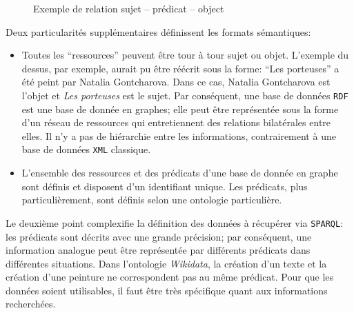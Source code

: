 \documentclass[a4paper, 12pt, twoside]{book}
\newcommand{\rdf}{\texttt{RDF}}
\newcommand{\sparql}{\texttt{\gls{SPARQL}}}
\newcommand{\xml}{\texttt{XML}}
\newcommand{\wkd}{\textit{Wikidata}}
\begin{document}
\begin{figure}[!h]
	\centering
	\caption{Exemple de relation sujet -- prédicat -- object}
	\label{fig:triplet}
\end{figure}

Deux particularités supplémentaires définissent les formats sémantiques:
\begin{itemize}
	\item Toutes les \enquote{ressources} peuvent être tour à tour sujet ou objet. L'exemple du dessus, par exemple, aurait pu être réécrit sous la forme: \enquote{Les porteuses} a été peint par Natalia Gontcharova. Dans ce cas, Natalia Gontcharova est l'objet et \textit{Les porteuses} est le sujet. Par conséquent, une base de données \rdf{} est une base de donnée en graphes; elle peut être représentée sous la forme d'un réseau de ressources qui entretiennent des relations bilatérales entre elles. Il n'y a pas de hiérarchie entre les informations, contrairement à une base de données \xml{} classique.
	\item L'ensemble des ressources et des prédicats d'une base de donnée en graphe sont définis et disposent d'un identifiant unique. Les prédicats, plus particulièrement, sont définis selon une ontologie particulière.
\end{itemize}

Le deuxième point complexifie la définition des données à récupérer via \sparql{}: les prédicats sont décrits avec une grande précision; par conséquent, une information analogue peut être représentée par différents prédicats dans différentes situations. Dans l'ontologie \wkd{}, la création d'un texte et la création d'une peinture ne correspondent pas au même prédicat. Pour que les données soient utilisables, il faut être très spécifique quant aux informations recherchées. 
\end{document}
